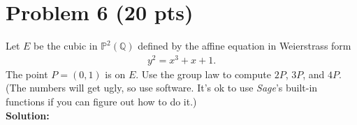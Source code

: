 \documentclass[12pt]{article}
\begin{document}
\newpage

















\section*{Problem 6 \small{(20 pts)}}

Let $E$ be the cubic in $\mathbb{P}^2(\mathbb{Q})$ defined by the affine equation in Weierstrass form
\begin{align*}
y^2 = x^3 + x + 1.
\end{align*}
The point $P = (0,1)$ is on $E$. Use the group law to compute $2P$, $3P$, and $4P$. (The numbers will get ugly, so use software. It's ok to use \textit{Sage}'s built-in functions if you can figure out how to do it.)\\





\noindent \textbf{Solution:} \\
\end{document}

